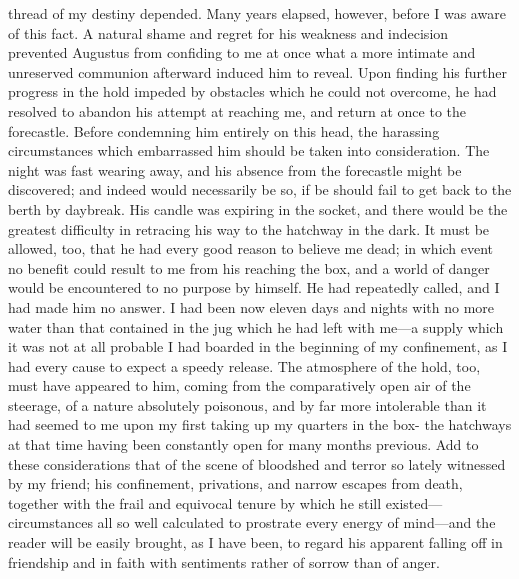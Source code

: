 thread of my destiny depended. Many years elapsed, however, before I was aware
of this fact. A natural shame and regret for his weakness and indecision
prevented Augustus from confiding to me at once what a more intimate and
unreserved communion afterward induced him to reveal. Upon finding his further
progress in the hold impeded by obstacles which he could not overcome, he had
resolved to abandon his attempt at reaching me, and return at once to the
forecastle. Before condemning him entirely on this head, the harassing
circumstances which embarrassed him should be taken into consideration. The
night was fast wearing away, and his absence from the forecastle might be
discovered; and indeed would necessarily be so, if be should fail to get back to
the berth by daybreak. His candle was expiring in the socket, and there would be
the greatest difficulty in retracing his way to the hatchway in the dark. It
must be allowed, too, that he had every good reason to believe me dead; in which
event no benefit could result to me from his reaching the box, and a world of
danger would be encountered to no purpose by himself. He had repeatedly called,
and I had made him no answer. I had been now eleven days and nights with no more
water than that contained in the jug which he had left with me---a supply which
it was not at all probable I had boarded in the beginning of my confinement, as
I had every cause to expect a speedy release. The atmosphere of the hold, too,
must have appeared to him, coming from the comparatively open air of the
steerage, of a nature absolutely poisonous, and by far more intolerable than it
had seemed to me upon my first taking up my quarters in the box- the hatchways
at that time having been constantly open for many months previous. Add to these
considerations that of the scene of bloodshed and terror so lately witnessed by
my friend; his confinement, privations, and narrow escapes from death, together
with the frail and equivocal tenure by which he still existed---circumstances
all so well calculated to prostrate every energy of mind---and the reader will
be easily brought, as I have been, to regard his apparent falling off in
friendship and in faith with sentiments rather of sorrow than of anger. 

